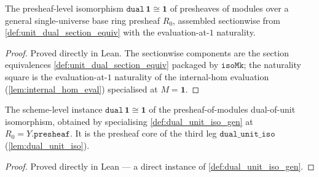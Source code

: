 \begin{definition}\leanok
  \label{def:dual_unit_iso_gen}
  The presheaf-level isomorphism
  \(\mathtt{dual}\,\mathbf 1 \cong \mathbf 1\) of presheaves of modules over a general
  single-universe base ring presheaf \(R_0\), assembled sectionwise from
  \cref{def:unit_dual_section_equiv} with the evaluation-at-\(1\) naturality.
\end{definition}
\begin{proof}
  \leanok
  Proved directly in Lean. The sectionwise components are the section equivalences
  \cref{def:unit_dual_section_equiv} packaged by \(\mathtt{isoMk}\); the naturality square is
  the evaluation-at-\(1\) naturality of the internal-hom evaluation
  (\cref{lem:internal_hom_eval}) specialised at \(M = \mathbf 1\).
\end{proof}

\begin{definition}\leanok
  \label{def:presheaf_dual_unit_iso}
  The scheme-level instance \(\mathtt{dual}\,\mathbf 1 \cong \mathbf 1\) of the
  presheaf-of-modules dual-of-unit isomorphism, obtained by specialising
  \cref{def:dual_unit_iso_gen} at \(R_0 = Y.\mathtt{presheaf}\). It is the presheaf core of
  the third leg \(\mathtt{dual\_unit\_iso}\) (\cref{lem:dual_unit_iso}).
\end{definition}
\begin{proof}
  \leanok
  Proved directly in Lean --- a direct instance of \cref{def:dual_unit_iso_gen}.
\end{proof}

